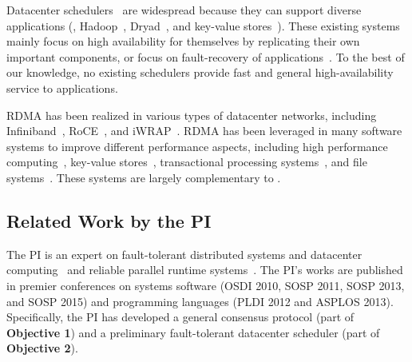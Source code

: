  Datacenter
schedulers~\cite{borg:eurosys15,mesos:nsdi11,tupperware,yarn:socc13,
autopilot:sosp07,quincy:sosp09,apollo:osdi14,fuxi:vldb14} are widespread 
because they can support diverse applications (\eg, 
Hadoop~\cite{hadoop}, Dryad~\cite{dryad}, and key-value stores~\cite{redis}). 
These existing systems mainly focus on high availability for themselves by 
replicating their own important components, or focus on fault-recovery of 
applications~\cite{fuxi:vldb14}. To the best of our knowledge, no existing 
schedulers provide fast and general high-availability service to 
applications.


 RDMA has been realized in various types of datacenter 
networks, including Infiniband~\cite{infiniband}, RoCE~\cite{roce}, and 
iWRAP~\cite{iwrap}. RDMA has been leveraged in many software systems to improve 
different performance aspects, including high performance 
computing~\cite{openmpi}, key-value 
stores~\cite{pilaf:usenix14,herd:sigcomm14,farm:nsdi14,memcached:rdma}, 
transactional processing systems~\cite{drtm:sosp15,farm:sosp15}, and file 
systems~\cite{gibson:nfs}. These systems are largely complementary to \xxx.

\vspace{-.15in}\subsection{Related Work by the PI} 
\label{sec:my-work}\vspace{-.075in}
% 

The PI is an expert on fault-tolerant distributed systems and datacenter 
computing~\cite{crane:sosp15, tripod:apsys16} and reliable parallel 
runtime systems~\cite{smt:cacm, cui:tern:osdi10, peregrine:sosp11, 
parrot:sosp13}. The PI's works are published in premier conferences on systems 
software (OSDI 2010, SOSP 2011, SOSP 2013, and SOSP 2015) and programming 
languages (PLDI 2012 and ASPLOS 2013). Specifically, the PI has developed a 
general consensus protocol (part of \textbf{Objective 1}) and a preliminary 
fault-tolerant datacenter scheduler (part of \textbf{Objective 2}).




